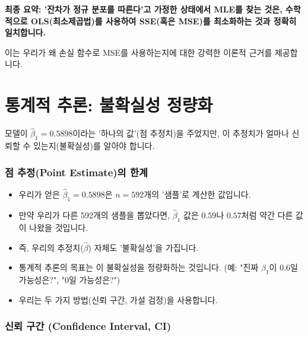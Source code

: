\documentclass[11pt,a4paper]{book}
\theoremstyle{definition}
\begin{document}
\begin{tcolorbox}[colback=yellow!5!white, colframe=red!75!black, title={핵심 결론: OLS는 MLE의 특별한 경우이다}]
\textbf{최종 요약: '잔차가 정규 분포를 따른다'고 가정한 상태에서 MLE를 찾는 것은, 수학적으로 OLS(최소제곱법)를 사용하여 SSE(혹은 MSE)를 최소화하는 것과 정확히 일치합니다.}

이는 우리가 왜 손실 함수로 MSE를 사용하는지에 대한 강력한 이론적 근거를 제공합니다.
\end{tcolorbox}


\part{통계적 추론: 불확실성 정량화}
\label{part:inference}

모델이 $\hat{\beta}_1 = 0.5898$이라는 '하나의 값'(점 추정치)을 주었지만, 이 추정치가 얼마나 신뢰할 수 있는지(불확실성)를 알아야 합니다.

\section{점 추정(Point Estimate)의 한계}

\begin{itemize}
    \item 우리가 얻은 $\hat{\beta}_1 = 0.5898$은 $n=592$개의 '샘플'로 계산한 값입니다.
    \item 만약 우리가 다른 592개의 샘플을 뽑았다면, $\hat{\beta}_1$ 값은 $0.59$나 $0.57$처럼 약간 다른 값이 나왔을 것입니다.
    \item 즉, 우리의 추정치($\hat{\beta}$) 자체도 '불확실성'을 가집니다.
    \item 통계적 추론의 목표는 이 불확실성을 정량화하는 것입니다. (예: "진짜 $\beta_1$이 0.6일 가능성은?", "0일 가능성은?")
    \item 우리는 두 가지 방법(신뢰 구간, 가설 검정)을 사용합니다.
\end{itemize}

\section{신뢰 구간 (Confidence Interval, CI)}
\end{document}
